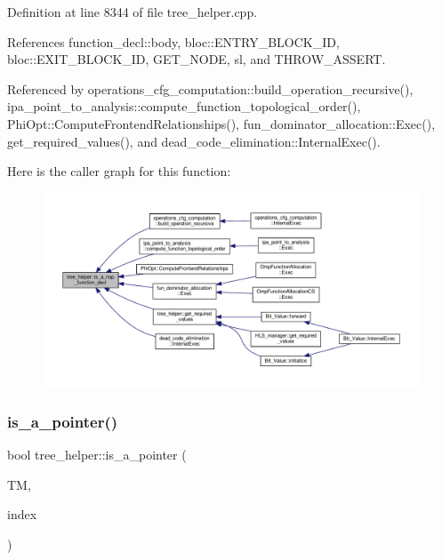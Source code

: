 Definition at line 8344 of file tree\+\_\+helper.\+cpp.



References function\+\_\+decl\+::body, bloc\+::\+E\+N\+T\+R\+Y\+\_\+\+B\+L\+O\+C\+K\+\_\+\+ID, bloc\+::\+E\+X\+I\+T\+\_\+\+B\+L\+O\+C\+K\+\_\+\+ID, G\+E\+T\+\_\+\+N\+O\+DE, sl, and T\+H\+R\+O\+W\+\_\+\+A\+S\+S\+E\+RT.



Referenced by operations\+\_\+cfg\+\_\+computation\+::build\+\_\+operation\+\_\+recursive(), ipa\+\_\+point\+\_\+to\+\_\+analysis\+::compute\+\_\+function\+\_\+topological\+\_\+order(), Phi\+Opt\+::\+Compute\+Frontend\+Relationships(), fun\+\_\+dominator\+\_\+allocation\+::\+Exec(), get\+\_\+required\+\_\+values(), and dead\+\_\+code\+\_\+elimination\+::\+Internal\+Exec().

Here is the caller graph for this function\+:
\nopagebreak
\begin{figure}[H]
\begin{center}
\leavevmode
\includegraphics[width=350pt]{d7/d99/classtree__helper_abfafd9aff94ad9bc9d4cd8aee81e044e_icgraph}
\end{center}
\end{figure}
\mbox{\label{classtree__helper_a45e95e6b9cc351e7ecbd7837c0388e0a}} 
\subsubsection{\texorpdfstring{is\+\_\+a\+\_\+pointer()}{is\_a\_pointer()}}
{\footnotesize\ttfamily bool tree\+\_\+helper\+::is\+\_\+a\+\_\+pointer (\begin{DoxyParamCaption}\item[{const \hyperlink{tree__manager_8hpp_a792e3f1f892d7d997a8d8a4a12e39346}{tree\+\_\+manager\+Const\+Ref} \&}]{TM,  }\item[{const unsigned int}]{index }\end{DoxyParamCaption})\hspace{0.3cm}{\ttfamily [static]}}



